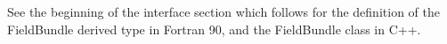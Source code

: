 

See the beginning of the interface section which
follows for the definition of the FieldBundle derived type
in Fortran 90, and the FieldBundle class in C++.

